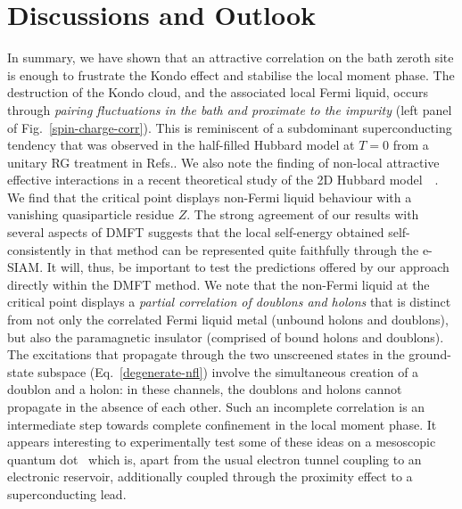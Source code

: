 \section{Discussions and Outlook}
\label{concl}
In summary, we have shown that an attractive correlation on the bath zeroth site is enough to frustrate the Kondo effect and stabilise the local moment phase. 
The destruction of the Kondo cloud, and the associated local Fermi liquid, occurs through {\it pairing fluctuations in the bath and proximate to the impurity} (left panel of Fig.~\eqref{spin-charge-corr}).
This is reminiscent of a subdominant superconducting tendency that was observed in the half-filled Hubbard model at $T=0$ from a unitary RG treatment in Refs.\cite{anirbanmott1,Mukherjee_mott_merg}. We also note the finding of non-local attractive effective interactions in a recent theoretical study of the 2D Hubbard model~\cite{gazizovaleblanc2023}~. 
We find that the critical point displays non-Fermi liquid behaviour with a vanishing quasiparticle residue \(Z\). 
The strong agreement of our results with several aspects of DMFT suggests that the local self-energy obtained self-consistently in that method can be represented quite faithfully through the e-SIAM. It will, thus, be important to test the predictions offered by our approach directly within the DMFT method. We note that the non-Fermi liquid at the critical point displays a {\it partial correlation of doublons and holons} that is distinct from not only the correlated Fermi liquid metal (unbound holons and doublons), but also the paramagnetic insulator (comprised of bound holons and doublons). The excitations that propagate through the two unscreened states in the ground-state subspace (Eq.~\eqref{degenerate-nfl}) involve the simultaneous creation of a doublon and a holon: in these channels, the doublons and holons cannot propagate in the absence of each other. Such an incomplete correlation is an intermediate step towards complete confinement in the local moment phase. It appears interesting to experimentally test some of these ideas on a mesoscopic quantum dot~\cite{Iftikhar2015,Iftikhar2018} which is, apart from the usual electron tunnel coupling to an electronic reservoir, additionally coupled through the proximity effect to a superconducting lead.

